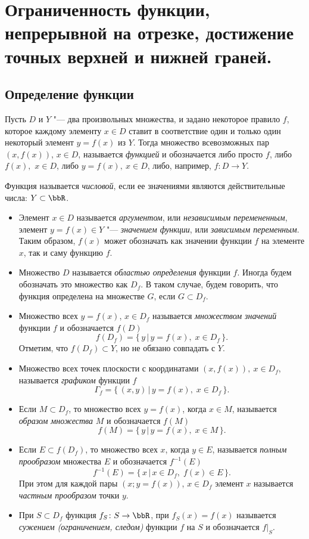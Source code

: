 \chapter{Ограниченность функции, непрерывной на отрезке, достижение точных верхней и нижней граней.}

\section{Определение функции}
\begin{defn}
Пусть $D$ и $Y$ "--- два произвольных множества, и задано некоторое правило $f$, которое каждому элементу $x\in D$ ставит в соответствие один и только один некоторый элемент $y=f(x)$ из $Y$. Тогда множество всевозможных пар $(x, f(x))$, $x\in D$, называется \textit{функцией} и обозначается либо просто $f$, либо $f(x),$ $x\in D$, либо $y=f(x),\ x\in D$, либо, например, $f\colon D \to Y$.
\end{defn}

Функция называется \textit{числовой}, если ее значениями являются действительные числа: $Y \subset \bbR$.
\begin{itemize}[wide, labelwidth=!, labelindent=0pt]
\item
Элемент $x \in D$ называется \textit{аргументом}, или \textit{независимым перемененным}, элемент $y=f(x) \in Y$ "--- \textit{значением функции}, или \textit{зависимым переменным}. Таким образом, $f(x)$ может обозначать как значении функции $f$ на элементе $x$, так и саму функцию $f$.
\item
Множество $D$ называется \textit{областью определения} функции $f$. Иногда будем обозначать это множество как $D_f$. В таком случае, будем говорить, что функция определена на множестве $G$, если $G \subset D_f$. 
\item
Множество всех $y=f(x)$, $x\in D_f$ называется \textit{множеством значений} функции $f$ и обозначается $f(D)$ 
$$
f(D_f)=\{\,y \,\big|\, y=f(x),\; x\in D_f\,\}.
$$
Отметим, что $f(D_f) \subset Y$, но не обязано совпадать с $Y$.
\item 
Множество всех точек плоскости с координатами $(x, f(x)),\ x\in D_f$, называется \textit{графиком} функции $f$ $$\Gamma_f = \{\,(x,y) \,\big|\, y = f(x),\; x\in D_f\,\}.$$
\item
Если $M \subset D_f$, то множество всех $y=f(x)$, когда $x\in M$, называется \textit{образом множества} $M$ и обозначается $f(M)$ $$f(M) = \{\,y\,\big|\, y=f(x),\; x\in M\,\}.$$
\item
Если $E \subset f(D_f)$, то множество всех $x$, когда $y\in E$, называется \textit{полным прообразом} множества $E$ и обозначается $f^{-1}(E)$ 
$$
f^{-1}(E)=\{\,x \,\big|\, x\in D_f,\; f(x)\in E\,\}.
$$
При этом для каждой пары $(x; y=f(x))$, $x\in D_f$ элемент $x$ называется \textit{частным прообразом} точки $y$.
\item
При $S\subset D_f$ функция $f_S\colon S\to\bbR$, при $f_S(x)=f(x)$ называется \textit{сужением (ограничением, следом)} функции $f$ на $S$ и обозначается $f\bigr|_S$.
\end{itemize}
 
